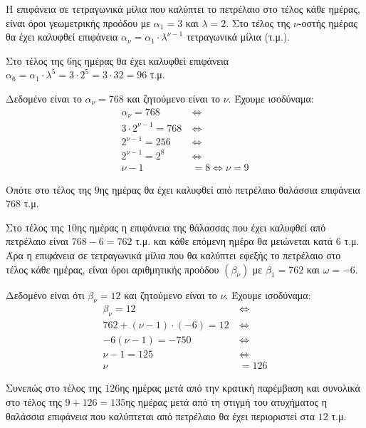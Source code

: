 
\begin{alist}
\item Η επιφάνεια σε τετραγωνικά μίλια που καλύπτει το πετρέλαιο στο τέλος κάθε ημέρας, είναι όροι γεωμετρικής προόδου με $\alpha_1 = 3$ και $\lambda = 2$. Στο τέλος της $\nu$-οστής ημέρας θα έχει καλυφθεί επιφάνεια $\alpha_\nu = \alpha_1 \cdot \lambda^{\nu-1}$ τετραγωνικά μίλια (τ.μ.).

Στο τέλος της $6$ης ημέρας θα έχει καλυφθεί επιφάνεια $\alpha_6 = \alpha_1 \cdot \lambda^5 = 3 \cdot 2^5 = 3 \cdot 32 = 96$ τ.μ. 

\item Δεδομένο είναι το $\alpha_\nu = 768$ και ζητούμενο είναι το $\nu$. Έχουμε ισοδύναμα:
\begin{align*}
\alpha_\nu = 768 \ &\Leftrightarrow \\
3 \cdot 2^{\nu-1} = 768 \ &\Leftrightarrow \\
2^{\nu-1} = 256 \ &\Leftrightarrow \\
2^{\nu-1} = 2^8 \ &\Leftrightarrow \\
\nu - 1 &= 8 \Leftrightarrow \nu = 9
\end{align*}

Οπότε στο τέλος της $9$ης ημέρας θα έχει καλυφθεί από πετρέλαιο θαλάσσια επιφάνεια $768$ τ.μ.

\item Στο τέλος της $10$ης ημέρας η επιφάνεια της θάλασσας που έχει καλυφθεί από πετρέλαιο είναι $768 - 6 = 762$ τ.μ. και κάθε επόμενη ημέρα θα μειώνεται κατά $6$ τ.μ. Άρα η επιφάνεια σε τετραγωνικά μίλια που θα καλύπτει εφεξής το πετρέλαιο στο τέλος κάθε ημέρας, είναι όροι αριθμητικής προόδου $(\beta_\nu)$ με $\beta_1 = 762$ και $\omega = -6$.

Δεδομένο είναι ότι $\beta_\nu = 12$ και ζητούμενο είναι το $\nu$. Έχουμε ισοδύναμα:
\begin{align*}
\beta_\nu = 12 \ &\Leftrightarrow \\
762 + (\nu - 1) \cdot (-6) = 12 \ &\Leftrightarrow \\
-6(\nu - 1) = -750 \ &\Leftrightarrow \\
\nu - 1 = 125 \ &\Leftrightarrow \\
\nu &= 126
\end{align*}

Συνεπώς στο τέλος της $126$ης ημέρας μετά από την κρατική παρέμβαση και συνολικά στο τέλος της $9 + 126 = 135$ης ημέρας μετά από τη στιγμή του ατυχήματος η θαλάσσια επιφάνεια που καλύπτεται από πετρέλαιο θα έχει περιοριστεί στα $12$ τ.μ.
\end{alist}

